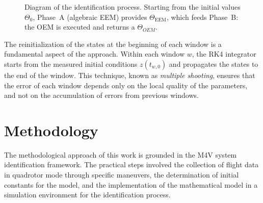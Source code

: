 \documentclass{ieeeaccess}
\begin{document}
\begin{figure}[!htbp]
{%
}
\caption{Diagram of the identification process. Starting from the initial values {$\Theta_0$}, Phase~A (algebraic EEM) provides {$\Theta_{\text{EEM}}$}, which feeds Phase~B: the OEM is executed and returns a {$\Theta_{OEM}$}.}
\label{fig:oem_diagram}
\end{figure}

The reinitialization of the states at the beginning of each window is a fundamental aspect of the approach. Within each window $w$, the RK4 integrator starts from the measured initial conditions $z(t_{w,0})$ and propagates the states to the end of the window. This technique, known as \textit{multiple shooting}, ensures that the error of each window depends only on the local quality of the parameters, and not on the accumulation of errors from previous windows.

\section{Methodology}
\label{sec:metodologia}

The methodological approach of this work is grounded in the M4V system identification framework. The practical steps involved the collection of flight data in quadrotor mode through specific maneuvers, the determination of initial constants for the model, and the implementation of the mathematical model in a simulation environment for the identification process.
\end{document}
